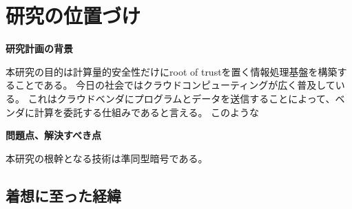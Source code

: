 
\section{研究の位置づけ}

\textbf{研究計画の背景}

本研究の目的は計算量的安全性だけにroot of trustを置く情報処理基盤を構築することである。 
今日の社会ではクラウドコンピューティングが広く普及している。
これはクラウドベンダにプログラムとデータを送信することによって、ベンダに計算を委託する仕組みであると言える。
このような

\textbf{問題点、解決すべき点}

本研究の根幹となる技術は準同型暗号である。
\subsection{着想に至った経緯}



